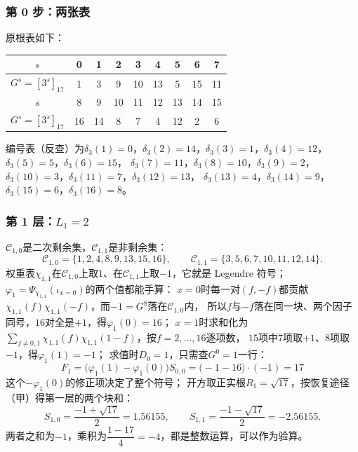 \documentclass[UTF8,a4paper,11pt]{ctexart}
\begin{document}
\subsubsection{第 0 步：两张表}
原根表如下：
\begin{center}
\begin{tabular}{c|cccccccc}
\toprule
$s$ & 0&1&2&3&4&5&6&7\\
\midrule
$G^s=[3^s]_{17}$ & 1&3&9&10&13&5&15&11\\
\midrule
$s$ & 8&9&10&11&12&13&14&15\\
\midrule
$G^s=[3^s]_{17}$ & 16&14&8&7&4&12&2&6\\
\bottomrule
\end{tabular}
\end{center}
编号表（反查）为$\delta_3(1)=0$，$\delta_3(2)=14$，$\delta_3(3)=1$，$\delta_3(4)=12$，$\delta_3(5)=5$，$\delta_3(6)=15$，
$\delta_3(7)=11$，$\delta_3(8)=10$，$\delta_3(9)=2$，$\delta_3(10)=3$，$\delta_3(11)=7$，$\delta_3(12)=13$，
$\delta_3(13)=4$，$\delta_3(14)=9$，$\delta_3(15)=6$，$\delta_3(16)=8$。

\subsubsection{第 1 层：$L_1=2$}
$\mathscr{C}_{1,0}$是二次剩余集，$\mathscr{C}_{1,1}$是非剩余集：
\[
 \mathscr{C}_{1,0}=\{1,2,4,8,9,13,15,16\},\qquad
 \mathscr{C}_{1,1}=\{3,5,6,7,10,11,12,14\}.
\]
权重表$\chi_{1,1}$在$\mathscr{C}_{1,0}$上取$1$、在$\mathscr{C}_{1,1}$上取$-1$，它就是 Legendre 符号；
$\varphi_1=\Psi_{\chi_{1,1}}(\iota_{x=0})$的两个值都能手算：
$x=0$时每一对$(f,-f)$都贡献$\chi_{1,1}(f)\chi_{1,1}(-f)$，而$-1=G^8$落在$\mathscr{C}_{1,0}$内，
所以$f$与$-f$落在同一块、两个因子同号，$16$对全是$+1$，得$\varphi_1(0)=16$；
$x=1$时求和化为$\sum_{f\ne0,1}\chi_{1,1}(f)\chi_{1,1}(1-f)$，按$f=2,\dots,16$逐项数，
$15$项中$7$项取$+1$、$8$项取$-1$，得$\varphi_1(1)=-1$；
求值时$D_0=1$，只需查$G^0=1$一行：
\[
 F_1=\bigl(\varphi_1(1)-\varphi_1(0)\bigr)S_{0,0}=\bigl(-1-16\bigr)\cdot(-1)=17
\]
这个$-\varphi_1(0)$的修正项决定了整个符号；
开方取正实根$R_1=\sqrt{17}$，按恢复途径（甲）得第一层的两个块和：
\[
 S_{1,0}=\frac{-1+\sqrt{17}}{2}=1.56155,\qquad
 S_{1,1}=\frac{-1-\sqrt{17}}{2}=-2.56155.
\]
两者之和为$-1$，乘积为$\dfrac{1-17}{4}=-4$，都是整数运算，可以作为验算。
\end{document}
